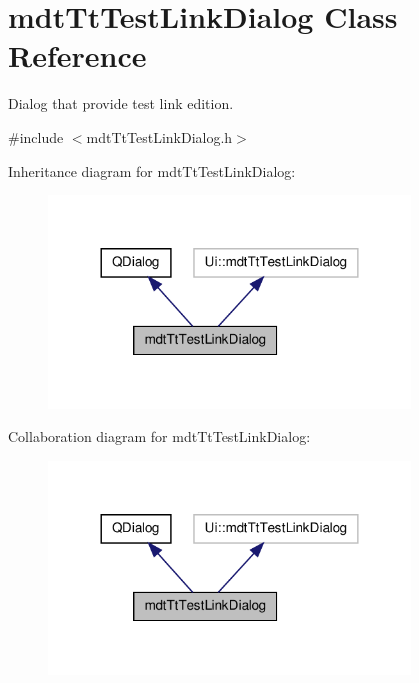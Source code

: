 \hypertarget{classmdt_tt_test_link_dialog}{\section{mdt\-Tt\-Test\-Link\-Dialog Class Reference}
\label{classmdt_tt_test_link_dialog}
}


Dialog that provide test link edition.  




{\ttfamily \#include $<$mdt\-Tt\-Test\-Link\-Dialog.\-h$>$}



Inheritance diagram for mdt\-Tt\-Test\-Link\-Dialog\-:
\nopagebreak
\begin{figure}[H]
\begin{center}
\leavevmode
\includegraphics[width=272pt]{classmdt_tt_test_link_dialog__inherit__graph}
\end{center}
\end{figure}


Collaboration diagram for mdt\-Tt\-Test\-Link\-Dialog\-:
\nopagebreak
\begin{figure}[H]
\begin{center}
\leavevmode
\includegraphics[width=272pt]{classmdt_tt_test_link_dialog__coll__graph}
\end{center}
\end{figure}

